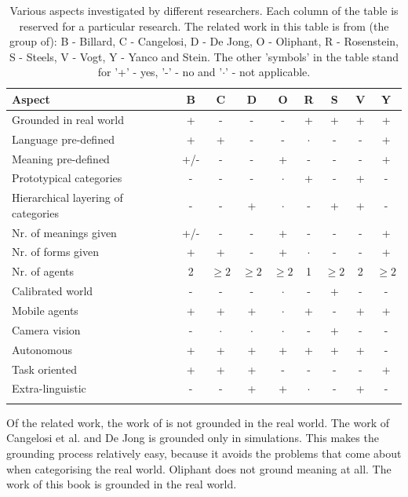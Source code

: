 \begin{table}[t]
\begin{tabular}{>{\raggedright}p{3.5cm}cccccccc}
\lsptoprule
Aspect & B & C & D & O & R & S & V & Y\\\midrule
Grounded in real world & + & - & - & - & + & + & + & +\\\hline
Language pre-defined & + & + & - & - & $\cdot$ & - & - & +\\\hline
Meaning pre-defined & +/- & - & - & + & - & - & - & +\\\hline
Prototypical categories & - & - & - & $\cdot$ & + & - & + & -\\\hline
Hierarchical layering of categories & - & - & + & $\cdot$ & - & + & + & -\\\hline
Nr. of meanings given & +/- & - & - & + & - & - & - & +\\\hline
Nr. of forms given & + & + & - & + & $\cdot$ & - & - & +\\\hline
Nr. of agents & 2 & $\geq 2$ & $\geq 2$ & $\geq 2$ & 1 & $\geq 2$ & 2 & $\geq 2$\\\hline
Calibrated world & - & - & - & $\cdot$ & - & + & - & -\\\hline
Mobile agents & + & + & + & $\cdot$ & + & - & + & +\\\hline
Camera vision & - & $\cdot$ & $\cdot$ & $\cdot$ & - & + & - & -\\\hline
Autonomous & + & + & + & + & + & + & + & -\\\hline
Task oriented & + & + & + & - & - & - & - & +\\\hline
Extra-linguistic & - & - & + & + & $\cdot$ & - & + & -\\
\lspbottomrule
\end{tabular}
\caption{Various aspects investigated by different researchers. Each column of the table is reserved for a particular research. The related work in this table is from (the group of): B - Billard, C - Cangelosi, D - De Jong, O - Oliphant, R - Rosenstein, S - Steels, V - Vogt, Y - Yanco and Stein. The other 'symbols' in the table stand for '+' - yes, '-' - no and '$\cdot$' - not applicable.}
\label{t:intro:contrib}
\end{table}


Of the related work, the work of \citep{cangelosiparisi:1998,dejong:2000,oliphant:1997} is not grounded in the real world. The work of Cangelosi et al. and De Jong is grounded only in simulations. This makes the grounding process relatively easy, because it avoids the problems that come about when categorising the real world. Oliphant does not ground meaning at all. The work of this book is grounded in the real world.

